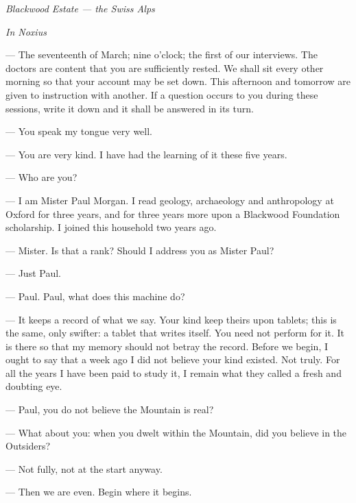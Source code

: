 
\begin{center}\small\itshape Blackwood Estate --- the Swiss Alps\end{center}

\begin{room}

\textit{In Noxius}

--- The seventeenth of March; nine o'clock; the first of our interviews. The doctors are content that you are sufficiently rested. We shall sit every other morning so that your account may be set down. This afternoon and tomorrow are given to instruction with another. If a question occurs to you during these sessions, write it down and it shall be answered in its turn.\par

--- You speak my tongue very well.\par

--- You are very kind. I have had the learning of it these five years.\par

--- Who are you?\par

--- I am Mister Paul Morgan. I read geology, archaeology and anthropology at Oxford for three years, and for three years more upon a Blackwood Foundation scholarship. I joined this household two years ago.\par

--- Mister. Is that a rank? Should I address you as Mister Paul?\par

--- Just Paul.\par

--- Paul. Paul, what does this machine do?\par

--- It keeps a record of what we say. Your kind keep theirs upon tablets; this is the same, only swifter: a tablet that writes itself. You need not perform for it. It is there so that my memory should not betray the record. Before we begin, I ought to say that a week ago I did not believe your kind existed. Not truly. For all the years I have been paid to study it, I remain what they called a fresh and doubting eye.\par

--- Paul, you do not believe the Mountain is real?\par

--- What about you: when you dwelt within the Mountain, did you believe in the Outsiders?\par

--- Not fully, not at the start anyway.\par

--- Then we are even. Begin where it begins.\par

\end{room}

